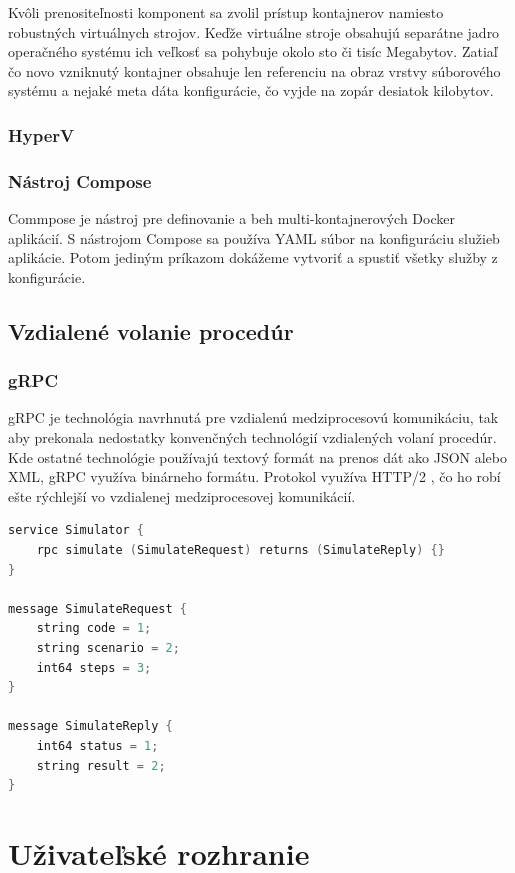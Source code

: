 Kvôli prenositeľnosti komponent sa zvolil prístup kontajnerov namiesto robustných virtuálnych strojov. Keďže virtuálne stroje obsahujú separátne jadro operačného systému ich veľkosť sa pohybuje okolo sto či tisíc Megabytov. Zatiaľ čo novo vzniknutý kontajner obsahuje len referenciu na obraz vrstvy súborového systému a nejaké meta dáta konfigurácie, čo vyjde na zopár desiatok kilobytov. \cite{kane2018docker}
\subsubsection{HyperV}

\subsubsection{Nástroj Compose}

Commpose je nástroj pre definovanie a beh multi-kontajnerových Docker aplikácií. S nástrojom Compose sa používa YAML súbor na konfiguráciu služieb aplikácie. Potom jediným príkazom dokážeme vytvoriť a spustiť všetky služby z konfigurácie. \cite{docker_docs}

\subsection{Vzdialené volanie procedúr}

\subsubsection{gRPC}
gRPC je technológia navrhnutá pre vzdialenú medziprocesovú komunikáciu, tak aby prekonala nedostatky konvenčných technológií vzdialených volaní procedúr. Kde ostatné technológie používajú textový formát na prenos dát ako JSON alebo XML, gRPC využíva binárneho formátu. Protokol využíva HTTP/2 \cite{kuruppu2019grpc}, čo ho robí ešte rýchlejší vo vzdialenej medziprocesovej komunikácií.

\begin{lstlisting}[language=C++]
service Simulator {
	rpc simulate (SimulateRequest) returns (SimulateReply) {}
}

message SimulateRequest {
	string code = 1;
	string scenario = 2;
	int64 steps = 3;
}

message SimulateReply {
	int64 status = 1;
	string result = 2;
}
\end{lstlisting}

\section{Uživateľské rozhranie}

